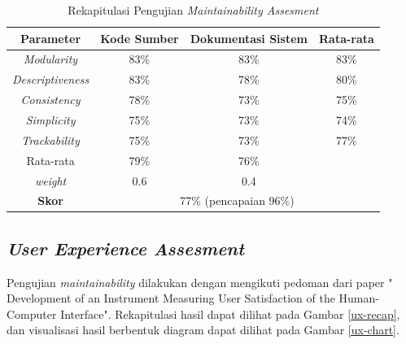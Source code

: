 \begin{table}[h]
	\centering
	\caption{Rekapitulasi Pengujian \textit{Maintainability Assesment}}
	\label{maintainability-recap}
	\begin{tabular}{c|c|c|c}
		\toprule
		\textbf{Parameter} & \textbf{Kode Sumber} & \textbf{Dokumentasi Sistem} & \textbf{Rata-rata} \\
		\hline
		
		\textit{Modularity} & 83\% & 83\% & 83\% \\ 
		\textit{Descriptiveness} & 83\% & 78\% & 80\% \\ 
		\textit{Consistency} & 78\% & 73\% & 75\% \\ 
		\textit{Simplicity} & 75\% & 73\% & 74\% \\ 
		\textit{Trackability} & 75\% & 73\% & 77\% \\ 
		Rata-rata & 79\% & 76\% &  \\ 
		\textit{weight} & 0.6 & 0.4 &  \\ \hline
		\textbf{Skor} & \multicolumn{3}{|c}{77\% (pencapaian 96\%)} \\ \hline
	\end{tabular}
\end{table}

\subsection{\textit{User Experience Assesment}}
Pengujian \textit{maintainability} dilakukan dengan mengikuti pedoman dari paper " Development of an Instrument Measuring User Satisfaction of the Human-Computer Interface"\cite{chin_development_1998}. Rekapitulasi hasil dapat dilihat pada Gambar \ref{ux-recap}, dan visualisasi hasil berbentuk diagram dapat dilihat pada Gambar \ref{ux-chart}.

